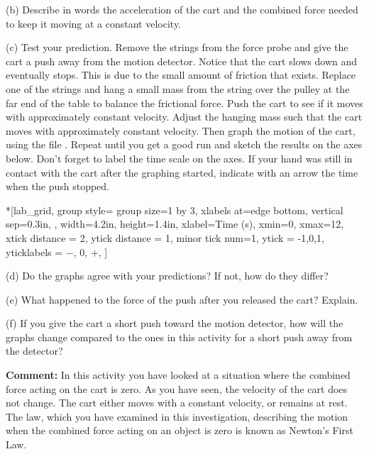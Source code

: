 (b) Describe in words the acceleration of the cart and the combined force needed
to keep it moving at a constant velocity.
\answerspace{15mm}

(c) Test your prediction. Remove the strings from the force probe and give the
cart a push away from the motion detector. Notice that the cart slows down and
eventually stops. This is due to the small amount of friction that exists. Replace
one of the strings and hang a small mass from the string over the pulley at
the far end of the table to balance the frictional force. Push the cart to see
if it moves with approximately constant velocity. Adjust the hanging mass such
that the cart moves with approximately constant velocity. Then graph the motion
of the cart, using the file . Repeat until you get a good run and sketch the results on the axes
below. Don't forget to label the time scale on the axes. If your hand was still
in contact with the cart after the graphing started, indicate with an arrow
the time when the push stopped.

\pagebreak[2]
\begin{lab_groupplot}*{}[lab_grid,
	group style={
		group size=1 by 3,
		xlabels at=edge bottom,
		vertical sep=0.3in,
		},
	width=4.2in,  height=1.4in,
	xlabel=Time (s),
	xmin=0, xmax=12,
	xtick distance = 2, 
	ytick distance = 1, 
	minor tick num=1,
	ytick = {-1,0,1},
	yticklabels = {$-$, 0, $+$},
	]
\nextgroupplot[
	ymin=-1,ymax=1, 
	ylabel={Velocity (m/s)},
	]
\nextgroupplot[
	ymin=-1,ymax=1, 
	ylabel={Acceleration (m/s$^2$)},
	]
\nextgroupplot[
	ymin=-1,ymax=1, 
	ylabel={Force (N)},
	]
\end{lab_groupplot}

(d) Do the graphs agree with your predictions? If not, how do they differ?
\answerspace{20mm}

(e) What happened to the force of the push after you released the cart? Explain.
\answerspace{20mm}

(f) If you give the cart a short push toward the motion detector, how will the
graphs change compared to the ones in this activity for a short push away from
the detector?
\answerspace{20mm}

\pagebreak[2]
\textbf{Comment:} In this activity you have looked at a situation where the
combined force acting on the cart is zero. As you have seen, the velocity of
the cart does not change. The cart either moves with a constant velocity, or
remains at rest. The law, which you have examined in this investigation, describing
the motion when the combined force acting on an object is zero is known as Newton's
First Law.

